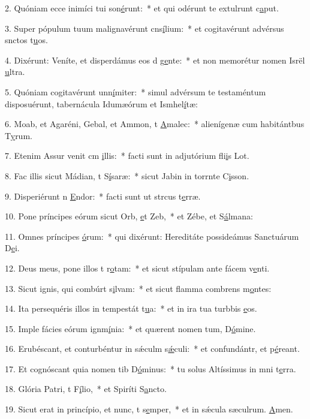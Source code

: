 2. Quóniam ecce inimíci tui son\uline{é}runt:~* et qui odérunt te extulrunt c\uline{a}put.\par 
3. Super pópulum tuum malignavérunt cns\uline{í}lium:~* et cogitavérunt advérsus snctos t\uline{u}os.\par 
4. Dixérunt: Veníte, et disperdámus eos d g\uline{e}nte:~* et non memorétur nomen Isrël \uline{u}ltra.\par 
5. Quóniam cogitavérunt unn\uline{í}miter:~* simul advérsum te testaméntum disposuérunt, tabernácula Idumæórum et Ismhel\uline{í}tæ:\par 
6. Moab, et Agaréni, Gebal, et Ammon, t \uline{A}malec:~* alienígenæ cum habitántbus T\uline{y}rum.\par 
7. Etenim Assur venit cm \uline{i}llis:~* facti sunt in adjutórium fli\uline{i}s Lot.\par 
8. Fac illis sicut Mádian, t S\uline{í}saræ:~* sicut Jabin in torrnte C\uline{i}sson.\par 
9. Disperiérunt n \uline{E}ndor:~* facti sunt ut strcus t\uline{e}rræ.\par 
10. Pone príncipes eórum sicut Orb, \uline{e}t Zeb,~* et Zébe, et S\uline{á}lmana:\par 
11. Omnes príncipes \uline{ó}rum:~* qui dixérunt: Hereditáte possideámus Sanctuárum D\uline{e}i.\par 
12. Deus meus, pone illos t r\uline{o}tam:~* et sicut stípulam ante fácem v\uline{e}nti.\par 
13. Sicut ignis, qui combúrt s\uline{i}lvam:~* et sicut flamma combrens m\uline{o}ntes:\par 
14. Ita persequéris illos in tempestát t\uline{u}a:~* et in ira tua turbbis \uline{e}os.\par 
15. Imple fácies eórum ignm\uline{í}nia:~* et quærent nomen tum, D\uline{ó}mine.\par 
16. Erubéscant, et conturbéntur in sǽculm s\uline{ǽ}culi:~* et confundántr, et p\uline{é}reant.\par 
17. Et cognóscant quia nomen tib D\uline{ó}minus:~* tu solus Altíssimus in mni t\uline{e}rra.\par 
18. Glória Patri, t F\uline{í}lio,~* et Spiríti S\uline{a}ncto.\par 
19. Sicut erat in princípio, et nunc, t s\uline{e}mper,~* et in sǽcula sæculrum. \uline{A}men.\par 
